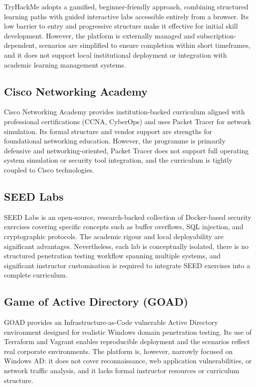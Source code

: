 TryHackMe \cite{tryhackme} adopts a gamified, beginner-friendly approach, combining structured
learning paths with guided interactive labs accessible entirely from a browser. Its low barrier to
entry and progressive structure make it effective for initial skill development. However, the
platform is externally managed and subscription-dependent, scenarios are simplified to ensure
completion within short timeframes, and it does not support local institutional deployment or
integration with academic learning management systems.

\subsection{Cisco Networking Academy}

Cisco Networking Academy \cite{cisco_netacad} provides institution-backed curriculum aligned with
professional certifications (CCNA, CyberOps) and uses Packet Tracer for network simulation.
Its formal structure and vendor support are strengths for foundational networking education.
However, the programme is primarily defensive and networking-oriented, Packet Tracer does not
support full operating system simulation or security tool integration, and the curriculum is
tightly coupled to Cisco technologies.

\subsection{SEED Labs}

SEED Labs \cite{seedlabs} is an open-source, research-backed collection of Docker-based security
exercises covering specific concepts such as buffer overflows, SQL injection, and cryptographic
protocols. The academic rigour and local deployability are significant advantages. Nevertheless,
each lab is conceptually isolated, there is no structured penetration testing workflow spanning
multiple systems, and significant instructor customisation is required to integrate SEED exercises
into a complete curriculum.

\subsection{Game of Active Directory (GOAD)}

GOAD \cite{goad} provides an Infrastructure-as-Code vulnerable Active Directory environment
designed for realistic Windows domain penetration testing. Its use of Terraform and Vagrant enables
reproducible deployment and the scenarios reflect real corporate environments. The platform is,
however, narrowly focused on Windows AD: it does not cover reconnaissance, web application
vulnerabilities, or network traffic analysis, and it lacks formal instructor resources or
curriculum structure.

